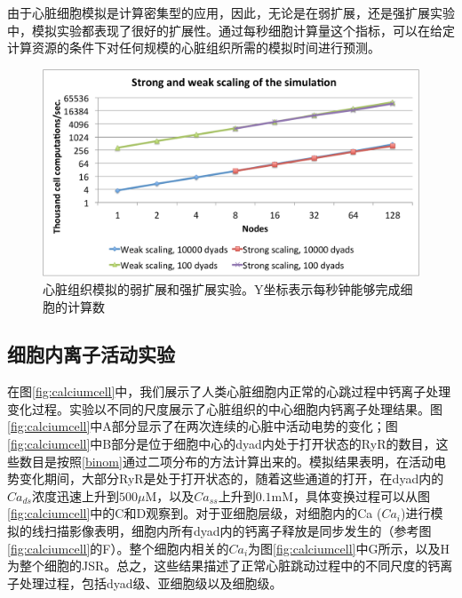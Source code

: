 由于心脏细胞模拟是计算密集型的应用，因此，无论是在弱扩展，还是强扩展实验中，模拟实验都表现了很好的扩展性。通过每秒细胞计算量这个指标，可以在给定计算资源的条件下对任何规模的心脏组织所需的模拟时间进行预测。

\begin{figure}[htb]
\center
\includegraphics[width=\textwidth]{figs/scaling.pdf}
\caption{ 心脏组织模拟的弱扩展和强扩展实验。Y坐标表示每秒钟能够完成细胞的计算数}
\label{scaling1}
\end{figure} 


\subsection{细胞内离子活动实验}

在图\ref{fig:calciumcell}中，我们展示了人类心脏细胞内正常的心跳过程中钙离子处理变化过程。实验以不同的尺度展示了心脏组织的中心细胞内钙离子处理结果。图\ref{fig:calciumcell}中A部分显示了在两次连续的心脏中活动电势的变化；图\ref{fig:calciumcell}中B部分是位于细胞中心的dyad内处于打开状态的RyR的数目，这些数目是按照\ref{binom}通过二项分布的方法计算出来的。模拟结果表明，在活动电势变化期间，大部分RyR是处于打开状态的，随着这些通道的打开，在dyad内的$Ca_{ds}$浓度迅速上升到$500\mu$M，以及$Ca_{ss}$上升到$0.1$mM，具体变换过程可以从图\ref{fig:calciumcell}中的C和D观察到。对于亚细胞层级，对细胞内的Ca ($Ca_{i}$)进行模拟的线扫描影像表明，细胞内所有dyad内的钙离子释放是同步发生的（参考图\ref{fig:calciumcell}的F）。整个细胞内相关的$Ca_i$为图\ref{fig:calciumcell}中G所示，以及H为整个细胞的JSR。总之，这些结果描述了正常心脏跳动过程中的不同尺度的钙离子处理过程，包括dyad级、亚细胞级以及细胞级。

